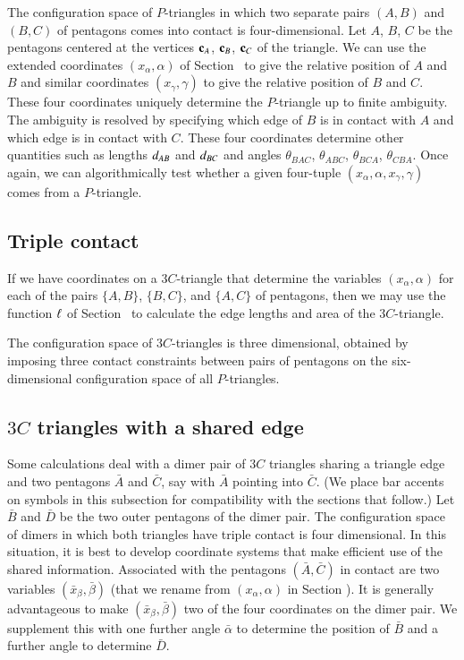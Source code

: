 The configuration space of $P$-triangles in which two separate pairs
$(A,B)$ and $(B,C)$ of pentagons comes into contact is
four-dimensional.  Let $A$, $B$, $C$ be the pentagons centered at the
vertices ${\mathbf c}_A$, ${\mathbf c}_B$, ${\mathbf c}_C$ of the triangle.  We can use the
extended coordinates $(x_\alpha,\alpha)$ of Section~
to give the relative position of $A$ and $B$ and similar coordinates
$(x_\gamma,\gamma)$ to give the relative position of $B$ and $C$.
These four coordinates uniquely determine the $P$-triangle up to
finite ambiguity.  The ambiguity is resolved by specifying which edge
of $B$ is in contact with $A$ and which edge is in contact with $C$.
These four coordinates determine other quantities such as lengths
$d_{AB}$ and $d_{BC}$ and angles $\theta_{BAC}$, $\theta_{ABC}$,
$\theta_{BCA}$, $\theta_{CBA}$.  Once again, we can algorithmically
test whether a given four-tuple $(x_\alpha,\alpha,x_\gamma,\gamma)$
comes from a $P$-triangle.

\subsection{Triple contact}

If we have coordinates on a $3C$-triangle that determine the variables
$(x_\alpha,\alpha)$ for each of the pairs $\{A,B\}$, $\{B,C\}$, and
$\{A,C\}$ of pentagons, then we may use the function $\ell$ of
Section~ to calculate the edge lengths and area of the
$3C$-triangle.

The configuration space of $3C$-triangles is three dimensional,
obtained by imposing three contact constraints between pairs of
pentagons on the six-dimensional configuration space of all
$P$-triangles.

\subsection{$3C$ triangles with a shared edge}

Some calculations deal with a dimer pair of $3C$ triangles sharing a
triangle edge and two pentagons $\bar{A}$ and $\bar{C}$, say with
$\bar{A}$ pointing into $\bar{C}$.  (We place bar accents on symbols
in this subsection for compatibility with the sections that follow.)
Let $\bar{B}$ and $\bar{D}$ be the two outer pentagons of the dimer
pair.  The configuration space of dimers in which both triangles have
triple contact is four dimensional.  In this situation, it is best to
develop coordinate systems that make efficient use of the shared
information.  Associated with the pentagons $(\bar{A},\bar{C})$ in
contact are two variables $(\bar x_\beta,\bar\beta)$ (that we rename
from $(x_\alpha,\alpha)$ in Section ).  It is generally
advantageous to make $(\bar x_\beta,\bar\beta)$ two of the four
coordinates on the dimer pair.  We supplement this with one further
angle $\bar\alpha$ to determine the position of $\bar B$ and a further
angle to determine $\bar D$.


